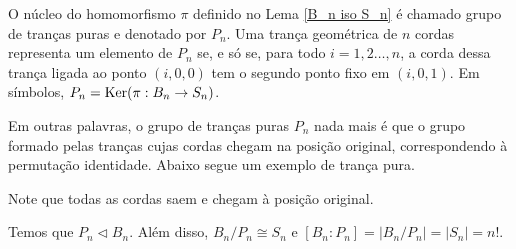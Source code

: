 	\begin{definition}
	\label{def P_n}
		O núcleo do homomorfismo $\pi$ definido no Lema \ref{B_n iso S_n} é chamado grupo de tranças 
		puras e denotado por $P_n$. Uma trança geométrica de $n$ cordas representa um elemento de 
		$P_n$ se, e só se, para todo $i=1,2\dots,n$, a corda dessa trança ligada ao ponto $(i,0,0)$ 
		tem o segundo ponto fixo em $(i,0,1)$. Em símbolos, $P_n = \operatorname{Ker}(\pi: B_n\to S_n )$.
	\end{definition}
	Em outras palavras, o grupo de tranças puras $P_n$ nada mais é que o grupo formado pelas 
	tranças cujas cordas chegam na posição original, correspondendo à permutação identidade. 
	Abaixo segue um exemplo de trança pura.
	\begin{center}
	\end{center}
	Note que todas as cordas saem e chegam à posição original.
	\begin{prop}
	\label{P_n normal em B_n}
		Temos que $P_n\vartriangleleft B_n$. Além disso, $B_n/P_n \cong S_n$ e 
		$[B_n:P_n] = |B_n/P_n| = |S_n| = n!$.
	\end{prop}
